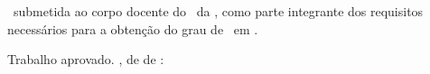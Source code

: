 

% 

\begin{folhadeaprovacao}
    \ABNTEXchapterfont%
    \center%

    {%
        \large
        \MakeUppercase{\ValorDoNomeCompletoDoAutor{}}
    }
    \vspace*{\fill}

    {%
        \Large
        \textbf{\MakeUppercase{\ValorDoTitulo{}}}%
        \par
        \ifDefinidoSubtitulo%
            \ValorDoSubtitulo{}%
            \par
        \fi
    }
    \vspace*{\fill}

    \hspace{.45\textwidth}
    \begin{minipage}{.5\textwidth}
        \ValorDoTipo{}\ submetida ao corpo docente do \ValorDaUnidadeAcademica{}\ da \ValorDaInstituicao{}, como
        parte integrante dos requisitos necess\'arios para a obten\c{c}\~ao do grau de \ValorDoGrau{}\ em \ValorDoCurso{}.
    \end{minipage}%
    \vspace*{\fill}

    {%
        Trabalho aprovado. \ValorDaCidade{}, \ValorDoDia{} de \ValorDoMes{} de \ValorDoAno{}:
    }

    \begin{multicols}{2}
        \setlength{\ABNTEXsignwidth}{7cm}%


        \ifDefinidoCoorientador%
        \fi


\end{multicols}
\end{folhadeaprovacao}
